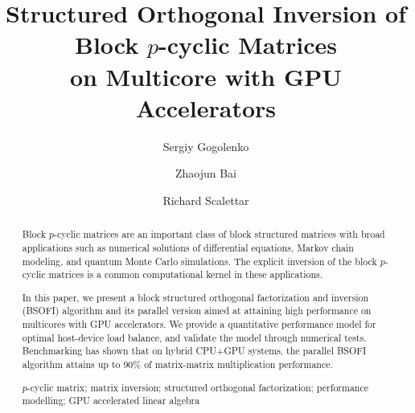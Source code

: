 \documentclass{llncs}
\newcommand{\Cuda}{{\sc CUDA}\xspace}
\begin{document}
\title{
  Structured Orthogonal Inversion of Block $p$-cyclic Matrices \\ 
  on Multicore with GPU Accelerators
}

\author{Sergiy Gogolenko 
  \and Zhaojun Bai
  \and Richard Scalettar }


\maketitle


\begin{abstract}
  Block $p$-cyclic matrices are an important class of block structured
  matrices with broad applications such as 
  numerical solutions of differential equations, 
  Markov chain modeling, 
  and quantum Monte Carlo simulations. 
  The explicit inversion of the block $p$-cyclic matrices is 
  a common computational kernel in these applications.

  In this paper, we present a block structured orthogonal
  factorization and inversion (BSOFI) algorithm
  and its parallel version aimed at attaining high performance on multicores with GPU accelerators. 
  We provide a quantitative performance model for optimal host-device 
  load balance, and validate the model through numerical tests.
  Benchmarking has shown that on hybrid CPU+GPU systems, the parallel BSOFI
  algorithm attains up to 90\% of matrix-matrix multiplication performance. 

  \begin{keywords}  
    $p$-cyclic matrix; matrix inversion; 
    structured orthogonal factorization;
    performance modelling; 
    GPU accelerated linear algebra %
  \end{keywords}
\end{abstract}
\end{document}
